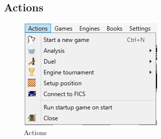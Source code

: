 \documentclass[11pt,a4paper]{article}
\begin{document}
	\subsection{Actions}
	\begin{figure}[H]
		\centering
		\includegraphics[scale=1.0]{Actions.png}
		\caption{Actions}
		\label{fig:Actions}
	\end{figure}
\end{document}
